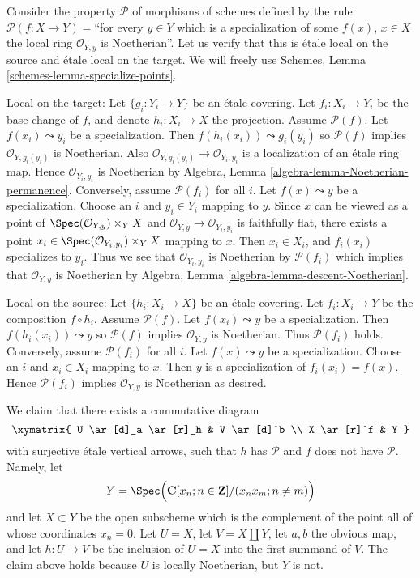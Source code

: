 \begin{example}
\label{example-silly-two}
Consider the property $\mathcal{P}$ of morphisms of schemes defined
by the rule $\mathcal{P}(f : X \to Y) = $``for every $y \in Y$ which is
a specialization of some $f(x)$, $x \in X$ the local ring
$\mathcal{O}_{Y, y}$ is Noetherian''. Let us verify that this is
\'etale local on the source and \'etale local on the target. We will freely use
Schemes, Lemma \ref{schemes-lemma-specialize-points}.

\medskip\noindent
Local on the target:
Let $\{g_i : Y_i \to Y\}$ be an \'etale covering. Let $f_i : X_i \to Y_i$
be the base change of $f$, and denote $h_i : X_i \to X$ the projection.
Assume $\mathcal{P}(f)$. Let $f(x_i) \leadsto y_i$
be a specialization. Then $f(h_i(x_i)) \leadsto g_i(y_i)$ so
$\mathcal{P}(f)$ implies $\mathcal{O}_{Y, g_i(y_i)}$ is Noetherian.
Also $\mathcal{O}_{Y, g_i(y_i)} \to \mathcal{O}_{Y_i, y_i}$ is a
localization of an \'etale ring map.
Hence $\mathcal{O}_{Y_i, y_i}$ is Noetherian by
Algebra, Lemma \ref{algebra-lemma-Noetherian-permanence}.
Conversely, assume $\mathcal{P}(f_i)$ for all $i$. Let $f(x) \leadsto y$
be a specialization. Choose an $i$ and $y_i \in Y_i$ mapping to $y$.
Since $x$ can be viewed as a point of
$\Spec(\mathcal{O}_{Y, y}) \times_Y X$ and
$\mathcal{O}_{Y, y} \to \mathcal{O}_{Y_i, y_i}$ is faithfully flat,
there exists a point
$x_i \in \Spec(\mathcal{O}_{Y_i, y_i}) \times_Y X$
mapping to $x$. Then $x_i \in X_i$, and $f_i(x_i)$ specializes to $y_i$.
Thus we see that $\mathcal{O}_{Y_i, y_i}$ is Noetherian by
$\mathcal{P}(f_i)$ which implies that $\mathcal{O}_{Y, y}$ is
Noetherian by
Algebra, Lemma \ref{algebra-lemma-descent-Noetherian}.

\medskip\noindent
Local on the source:
Let $\{h_i : X_i \to X\}$ be an \'etale covering. Let $f_i : X_i \to Y$
be the composition $f \circ h_i$. Assume $\mathcal{P}(f)$. Let
$f(x_i) \leadsto y$ be a specialization. Then $f(h_i(x_i)) \leadsto y$ so
$\mathcal{P}(f)$ implies $\mathcal{O}_{Y, y}$ is Noetherian. Thus
$\mathcal{P}(f_i)$ holds.
Conversely, assume $\mathcal{P}(f_i)$ for all $i$. Let $f(x) \leadsto y$
be a specialization. Choose an $i$ and $x_i \in X_i$ mapping to $x$.
Then $y$ is a specialization of $f_i(x_i) = f(x)$. Hence
$\mathcal{P}(f_i)$ implies $\mathcal{O}_{Y, y}$ is Noetherian
as desired.

\medskip\noindent
We claim that there exists a commutative diagram
$$
\xymatrix{
U \ar[d]_a \ar[r]_h & V \ar[d]^b \\
X \ar[r]^f & Y
}
$$
with surjective \'etale vertical arrows, such that $h$ has $\mathcal{P}$
and $f$ does not have $\mathcal{P}$. Namely, let
$$
Y =
\Spec\Big(
\mathbf{C}[x_n; n \in \mathbf{Z}]/(x_n x_m; n \not = m)
\Big)
$$
and let $X \subset Y$ be the open subscheme which is the complement of
the point all of whose coordinates $x_n = 0$. Let $U = X$, let
$V = X \coprod Y$, let $a, b$ the obvious map, and let $h : U \to V$
be the inclusion of $U = X$ into the first summand of $V$. The claim above
holds because $U$ is locally Noetherian, but $Y$ is not.
\end{example}

